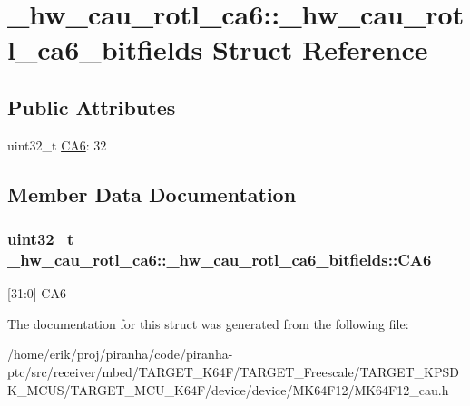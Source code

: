 \hypertarget{struct__hw__cau__rotl__ca6_1_1__hw__cau__rotl__ca6__bitfields}{}\section{\+\_\+hw\+\_\+cau\+\_\+rotl\+\_\+ca6\+:\+:\+\_\+hw\+\_\+cau\+\_\+rotl\+\_\+ca6\+\_\+bitfields Struct Reference}
\label{struct__hw__cau__rotl__ca6_1_1__hw__cau__rotl__ca6__bitfields}
\subsection*{Public Attributes}
\begin{DoxyCompactItemize}
\item 
uint32\+\_\+t \hyperlink{struct__hw__cau__rotl__ca6_1_1__hw__cau__rotl__ca6__bitfields_ab172f131badbad8a551f98ff55bdc8dc}{C\+A6}\+: 32
\end{DoxyCompactItemize}


\subsection{Member Data Documentation}
\subsubsection[{\texorpdfstring{C\+A6}{CA6}}]{\setlength{\rightskip}{0pt plus 5cm}uint32\+\_\+t \+\_\+hw\+\_\+cau\+\_\+rotl\+\_\+ca6\+::\+\_\+hw\+\_\+cau\+\_\+rotl\+\_\+ca6\+\_\+bitfields\+::\+C\+A6}\hypertarget{struct__hw__cau__rotl__ca6_1_1__hw__cau__rotl__ca6__bitfields_ab172f131badbad8a551f98ff55bdc8dc}{}\label{struct__hw__cau__rotl__ca6_1_1__hw__cau__rotl__ca6__bitfields_ab172f131badbad8a551f98ff55bdc8dc}
\mbox{[}31\+:0\mbox{]} C\+A6 

The documentation for this struct was generated from the following file\+:\begin{DoxyCompactItemize}
\item 
/home/erik/proj/piranha/code/piranha-\/ptc/src/receiver/mbed/\+T\+A\+R\+G\+E\+T\+\_\+\+K64\+F/\+T\+A\+R\+G\+E\+T\+\_\+\+Freescale/\+T\+A\+R\+G\+E\+T\+\_\+\+K\+P\+S\+D\+K\+\_\+\+M\+C\+U\+S/\+T\+A\+R\+G\+E\+T\+\_\+\+M\+C\+U\+\_\+\+K64\+F/device/device/\+M\+K64\+F12/M\+K64\+F12\+\_\+cau.\+h\end{DoxyCompactItemize}
